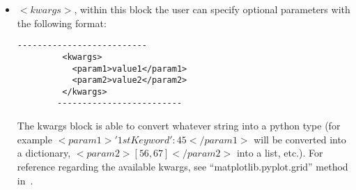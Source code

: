 \begin{itemize}
\begin{itemize}
        \item \textit{$<kwargs>$},  within this block the user can specify optional parameters with the following format:
        \begin{lstlisting}[style=XML]
        --------------------------
         <kwargs>
           <param1>value1</param1>
           <param2>value2</param2>
         </kwargs>
        -------------------------
       \end{lstlisting}
         The kwargs block is able to convert whatever string into a python type (for example $<param1>{'1stKeyword':45}</param1>$ will be converted into a dictionary, $<param2>[56,67]</param2>$ into a list, etc.). For reference regarding the available kwargs, see ``matplotlib.pyplot.grid'' method in~\cite{MatPlotLib}.
      \end{itemize}
\vspace{-5mm}
\end{itemize}
